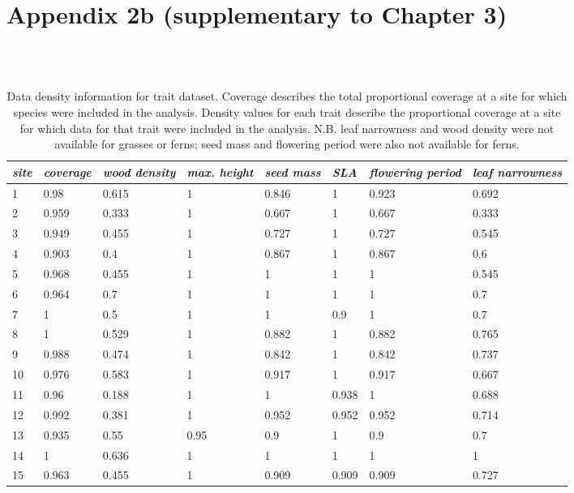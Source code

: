 \chapter[Appendix 2b (supplementary to Chapter 3)]{Appendix 2b (supplementary to Chapter 3)}

\begin{landscape}
\begin{table}[ht]
\tiny
\centering
\caption[Data density information for trait dataset.]{\small{Data density information for trait dataset. Coverage describes the total proportional coverage at a site for which species were included in the analysis. Density values for each trait describe the proportional coverage at a site for which data for that trait were included in the analysis. N.B. leaf narrowness and wood density were not available for grasses or ferns; seed mass and flowering period were also not available for ferns.}} \\
\label{Ch3sup2_T1} \\
{\tabulinesep=1.2mm
\begin{tabu} to \linewidth {XXXXXXXX}
\hline
\textit{site} & \textit{coverage} & \textit{wood density} & \textit{max. height} & \textit{seed mass} & \textit{SLA} & \textit{flowering period} & \textit{leaf narrowness} \\
 & 0.98 & 0.615 & 1 & 0.846 & 1 & 0.923 & 0.692 \\
2 & 0.959 & 0.333 & 1 & 0.667 & 1 & 0.667 & 0.333 \\
3 & 0.949 & 0.455 & 1 & 0.727 & 1 & 0.727 & 0.545 \\
4 & 0.903 & 0.4 & 1 & 0.867 & 1 & 0.867 & 0.6 \\
5 & 0.968 & 0.455 & 1 & 1 & 1 & 1 & 0.545 \\
6 & 0.964 & 0.7 & 1 & 1 & 1 & 1 & 0.7 \\
7 & 1 & 0.5 & 1 & 1 & 0.9 & 1 & 0.7 \\
8 & 1 & 0.529 & 1 & 0.882 & 1 & 0.882 & 0.765 \\
9 & 0.988 & 0.474 & 1 & 0.842 & 1 & 0.842 & 0.737 \\
10 & 0.976 & 0.583 & 1 & 0.917 & 1 & 0.917 & 0.667 \\
11 & 0.96 & 0.188 & 1 & 1 & 0.938 & 1 & 0.688 \\
12 & 0.992 & 0.381 & 1 & 0.952 & 0.952 & 0.952 & 0.714 \\
13 & 0.935 & 0.55 & 0.95 & 0.9 & 1 & 0.9 & 0.7 \\
14 & 1 & 0.636 & 1 & 1 & 1 & 1 & 1 \\
15 & 0.963 & 0.455 & 1 & 0.909 & 0.909 & 0.909 & 0.727 \\
\hline
\end{tabu}}
\end{table}
\end{landscape}
\clearpage

